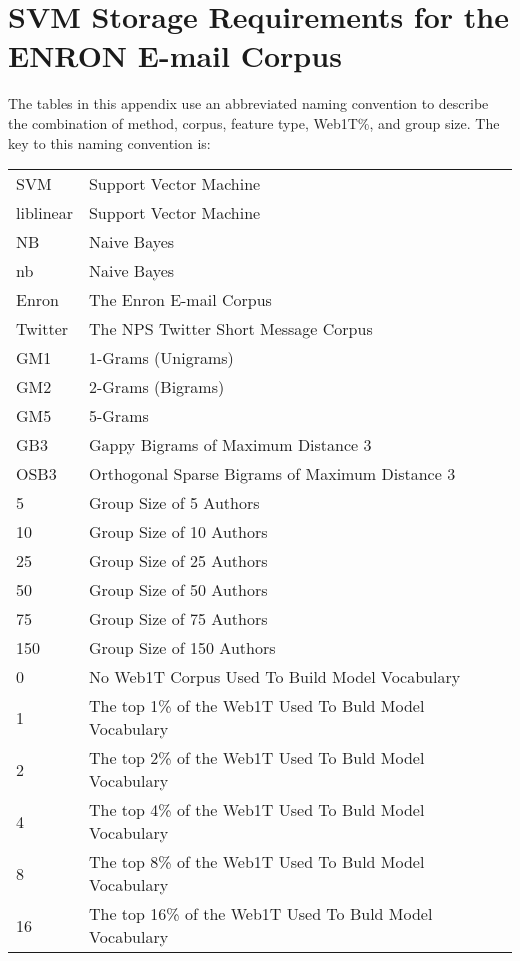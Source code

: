 \chapter{SVM Storage Requirements for the ENRON E-mail Corpus}

The tables in this appendix use an abbreviated naming convention to describe the combination of method, corpus, feature type, Web1T\%, and group size.  The key to this naming convention is:

\begin{center}
\begin{table}[htbp!]
	\begin{center}
	\begin{tabular}{ll}
	SVM & Support Vector Machine\\
	liblinear & Support Vector Machine\\
	NB & Naive Bayes\\
	nb & Naive Bayes\\
	
	Enron & The Enron E-mail Corpus\\
	Twitter & The NPS Twitter Short Message Corpus\\
	
	GM1 & 1-Grams (Unigrams)\\
	GM2 & 2-Grams (Bigrams)\\
	GM5 & 5-Grams\\
	GB3 & Gappy Bigrams of Maximum Distance 3\\
	OSB3 & Orthogonal Sparse Bigrams of Maximum Distance 3\\
		
	5 & Group Size of 5 Authors\\
	10 & Group Size of 10 Authors\\
	25 & Group Size of 25 Authors\\
	50 & Group Size of 50 Authors\\
	75 & Group Size of 75 Authors\\
	150 & Group Size of 150 Authors\\
	
	0 & No Web1T Corpus Used To Build Model Vocabulary\\
	1 & The top 1\% of the Web1T Used To Buld Model Vocabulary\\
	2 & The top 2\% of the Web1T Used To Buld Model Vocabulary\\
	4 & The top 4\% of the Web1T Used To Buld Model Vocabulary\\
	8 & The top 8\% of the Web1T Used To Buld Model Vocabulary\\
	16 & The top 16\% of the Web1T Used To Buld Model Vocabulary\\
	\end{tabular}
	\end{center}
\end{table}
\end{center}


